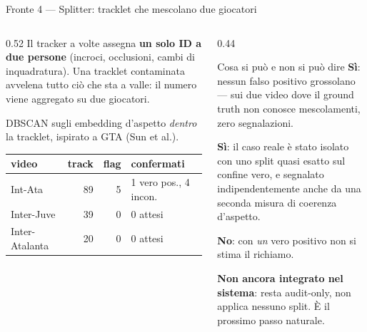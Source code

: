 \documentclass[aspectratio=169,10pt]{beamer}
\begin{document}
\begin{frame}{Fronte 4 --- Splitter: tracklet che mescolano due giocatori}
  \begin{columns}[T]
    \begin{column}{0.52\textwidth}
      \small
      Il tracker a volte assegna \textbf{un solo ID a due persone} (incroci,
      occlusioni, cambi di inquadratura). Una tracklet contaminata avvelena
      tutto ciò che sta a valle: il numero viene aggregato su due giocatori.
      \vspace{0.5em}

      DBSCAN sugli embedding d'aspetto \emph{dentro} la tracklet, ispirato a
      GTA (Sun et al.).
      \vspace{0.5em}
      \begin{center}\footnotesize
      \begin{tabular}{lrrl}
        \toprule
        video & track & flag & confermati \\
        \midrule
        Int-Ata & 89 & 5 & 1 vero pos., 4 incon. \\
        Inter-Juve & 39 & 0 & 0 attesi \\
        Inter-Atalanta & 20 & 0 & 0 attesi \\
        \bottomrule
      \end{tabular}
      \end{center}
    \end{column}
    \begin{column}{0.44\textwidth}
      \footnotesize
      \begin{block}{Cosa si può e non si può dire}
        \textbf{Sì}: nessun falso positivo grossolano --- sui due video dove
        il ground truth non conosce mescolamenti, zero segnalazioni.
        \vspace{0.3em}

        \textbf{Sì}: il caso reale è stato isolato con uno split quasi esatto
        sul confine vero, e segnalato indipendentemente anche da una seconda
        misura di coerenza d'aspetto.
        \vspace{0.3em}

        \textbf{No}: con \emph{un} vero positivo non si stima il richiamo.
      \end{block}
      \vspace{0.2em}
      \textbf{Non ancora integrato nel sistema}: resta audit-only, non applica
      nessuno split. È il prossimo passo naturale.
    \end{column}
  \end{columns}
\end{frame}
\end{document}
